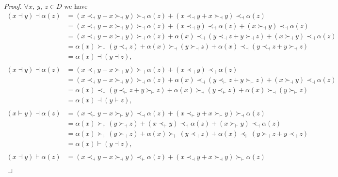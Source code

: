 \documentclass[11pt,twoside,reqno]{amsart}
\theoremstyle{plain}
\theoremstyle{definition}
\begin{document}
\begin{proof}
$\forall x,\  y,\  z \in D $ we have 
\begin{align*}
(x \dashv y) \dashv \alpha(z) 
&= (x \prec_\dashv y + x \succ_\dashv y) \succ_\dashv \alpha(z) + (x \prec_\dashv y + x \succ_\dashv y) \prec_\dashv \alpha(z) \\
&= (x \prec_\dashv y + x \succ_\dashv y) \succ_\dashv \alpha(z) + (x \prec_\dashv y) \prec_\dashv \alpha(z) + (x \succ_\dashv y) \prec_\dashv \alpha(z) \\
&= (x \prec_\dashv y + x \succ_\dashv y) \succ_\dashv \alpha(z) + \alpha(x) \prec_\dashv (y \prec_\dashv z + y \succ_\dashv z) + (x \succ_\dashv y) \prec_\dashv \alpha(z) \\
&= \alpha(x) \succ_\dashv (y \prec_\dashv z) + \alpha(x) \succ_\dashv (y \succ_\dashv z) + \alpha(x) \prec_\dashv (y \prec_\dashv z + y \succ_\dashv z) \\
&= \alpha(x) \dashv (y \dashv z), \\
\\
(x \dashv y) \dashv \alpha(z) 
&= (x \prec_\dashv y + x \succ_\dashv y) \succ_\dashv \alpha(z) + (x \prec_\dashv y) \prec_\dashv \alpha(z) \\
&= (x \prec_\dashv y + x \succ_\dashv y) \succ_\dashv \alpha(z) + \alpha(x) \prec_\dashv (y \prec_\vdash z + y \succ_\vdash z) + (x \succ_\dashv y) \prec_\dashv \alpha(z) \\
&= \alpha(x) \prec_\dashv (y \prec_\vdash z + y \succ_\vdash z) + \alpha(x) \succ_\dashv (y \prec_\vdash z) + \alpha(x) \succ_\dashv (y \succ_\vdash z) \\
&= \alpha(x) \dashv (y \vdash z), \\
\\
(x \vdash y) \dashv \alpha(z) 
&= (x \prec_\vdash y + x \succ_\vdash y) \prec_\dashv \alpha(z) + (x \prec_\vdash y + x \succ_\vdash y) \succ_\dashv \alpha(z) \\
&= \alpha(x) \succ_\vdash (y \succ_\dashv z) + (x \prec_\vdash y) \prec_\dashv \alpha(z) + (x \succ_\vdash y) \prec_\dashv \alpha(z) \\
&= \alpha(x) \succ_\vdash (y \succ_\dashv z) + \alpha(x) \succ_\vdash (y \prec_\dashv z) + \alpha(x) \prec_\vdash (y \succ_\dashv z + y \prec_\dashv z) \\
&= \alpha(x) \vdash (y \dashv z), \\
\\
(x \dashv y) \vdash \alpha(z) 
&= (x \prec_\dashv y + x \succ_\dashv y) \prec_\vdash \alpha(z) + (x \prec_\dashv y + x \succ_\dashv y) \succ_\vdash \alpha(z) \\

\end{align*}
\end{proof}
\end{document}
